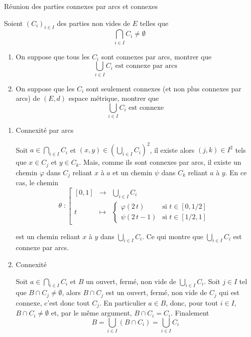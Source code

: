 \begin{question}{Réunion des parties connexes par arcs et connexes}{}

Soient $\left(C_i\right)_{i\in I}$ des parties non vides de $E$ telles que
$$\bigcap_{i\in I} C_i\ne\emptyset$$
\begin{enumerate}

    \item On suppose que tous les $C_i$ sont connexes par arcs, montrer que
$$\bigcup_{i\in I} C_i \text{ est connexe par arcs}$$
\item
On suppose que les $C_i$ sont seulement connexes (et non plus connexes par arcs) de $(E,d)$ espace métrique, montrer que
$$\bigcup_{i\in I} C_i \text{ est connexe}$$
\end{enumerate}
\end{question}

\begin{myproof}
\begin{enumerate}
    \item Connexité par arcs 

      Soit $a\in\bigcap_{i\in I} C_i$ et $(x,y)\in\left(\bigcup_{i\in I} C_i\right)^2$, il existe alors $(j,k)\in I^2$ tels que $x\in C_j$ et $y\in C_k$. Mais, comme ils sont connexes par arcs, il existe un chemin $\varphi$ dans $C_j$ reliant $x$ à $a$ et un chemin $\psi$ dans $C_k$ reliant $a$ à $y$. En ce cas, le chemin
$$\theta\;:\left[\begin{array}{ccc} [0,1]&\longrightarrow&\bigcup_{i\in I} C_i \\ t&\longmapsto& \begin{cases} \varphi(2\,t)&\text{si } t\in[0,1/2]\\ \psi(2\,t-1)&\text{si } t\in[1/2,1]\end{cases}\end{array}\right.$$

est un chemin reliant $x$ à $y$ dans $\bigcup_{i\in I} C_i$. Ce qui montre que $\bigcup_{i\in I} C_i$ est connexe par arcs.
    \item Connexité

Soit $a\in\bigcap_{i\in I} C_i$ et $B$ un ouvert, fermé, non vide de $\bigcup_{i\in I} C_i$. Soit $j\in I$ tel que $B\cap C_j\ne\emptyset$, alors $B\cap C_j$ est un ouvert, fermé, non vide de $C_j$ qui est connexe, c'est donc tout $C_j$. En particulier $a\in B$, donc, pour tout $i\in I$, $B\cap C_i\ne\emptyset$ et, par le même argument, $B\cap C_i=C_i$. Finalement
$$B=\bigcup_{i\in I} \left(B\cap C_i\right)=\bigcup_{i\in I} C_i$$
\end{enumerate}
\end{myproof}

